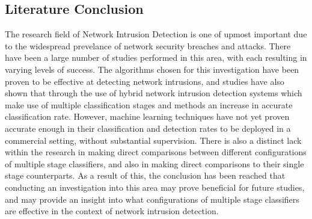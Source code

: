 	\subsection{Literature Conclusion}
	The research field of Network Intrusion Detection is one of upmost important due to the widespread prevelance of network security breaches and attacks. There have been a large number of studies performed in this area, with each resulting in varying levels of success. The algorithms chosen for this investigation have been proven to be effective at detecting network intrusions, and studies have also shown that through the use of hybrid network intrusion detection systems which make use of multiple classification stages and methods an increase in accurate classification rate. However, machine learning techniques have not yet proven accurate enough in their classification and detection rates to be deployed in a commercial setting, without substantial supervision. There is also a distinct lack within the research in making direct comparisons between different configurations of multiple stage classifiers, and also in making direct comparisons to their single stage counterparts. As a result of this, the conclusion has been reached that conducting an investigation into this area may prove beneficial for future studies, and may provide an insight into what configurations of multiple stage classifiers are effective in the context of network intrusion detection.